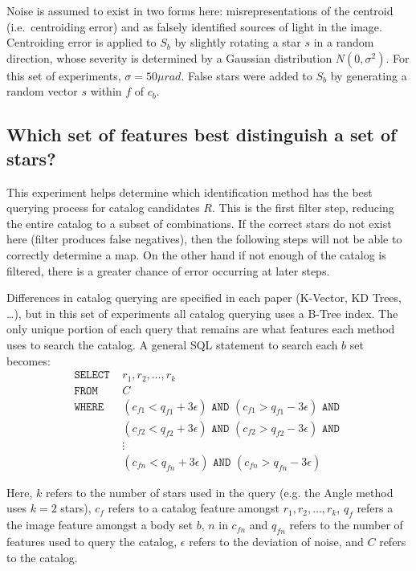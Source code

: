 Noise is assumed to exist in two forms here: misrepresentations of the centroid (i.e.\ centroiding error) and as
falsely identified sources of light in the image.
Centroiding error is applied to $S_b$ by slightly rotating a star $s$ in a random direction, whose severity is
determined by a Gaussian distribution $N(0, \sigma^2)$.
For this set of experiments, $\sigma = 50\mu rad$.
False stars were added to $S_b$ by generating a random vector $s$ within $f$ of $c_b$.

\subsection{Which set of features best distinguish a set of stars?}\label{subsec:featureUniquenessMethods}
This experiment helps determine which identification method has the best querying process for catalog candidates $R$.
This is the first filter step, reducing the entire catalog to a subset of combinations.
If the correct stars do not exist here (filter produces false negatives), then the following steps will not be able to
correctly determine a map.
On the other hand if not enough of the catalog is filtered, there is a greater chance of error occurring at later steps.

Differences in catalog querying are specified in each paper (K-Vector, KD Trees, \ldots), but in this set of
experiments all catalog querying uses a B-Tree index.
The only unique portion of each query that remains are what features each method uses to search the catalog.
A general SQL statement to search each $b$ set becomes:
\begin{align*}
    \texttt{SELECT } &r_1, r_2, \ldots, r_k \\
    \texttt{FROM } &C \\
    \texttt{WHERE } &(c_{f1} < q_{f1} + 3\epsilon) \texttt{ AND } (c_{f1} > q_{f1} - 3\epsilon) \texttt{ AND } \\
    &(c_{f2} < q_{f2} + 3\epsilon) \texttt{ AND } (c_{f2} > q_{f2} - 3\epsilon) \texttt{ AND } \\
    &\vdots \\
    &(c_{fn} < q_{fn} + 3\epsilon) \texttt{ AND } (c_{fn} > q_{fn} - 3\epsilon)
\end{align*}

Here, $k$ refers to the number of stars used in the query (e.g. the Angle method uses $k = 2$ stars), $c_f$ refers to
a catalog feature amongst $r_1, r_2, \ldots, r_k$, $q_f$ refers a the image feature amongst a body set $b$, $n$ in
$c_{fn}$ and $q_{fn}$ refers to the number of features used to query the catalog, $\epsilon$ refers to the deviation
of noise, and $C$ refers to the catalog.


